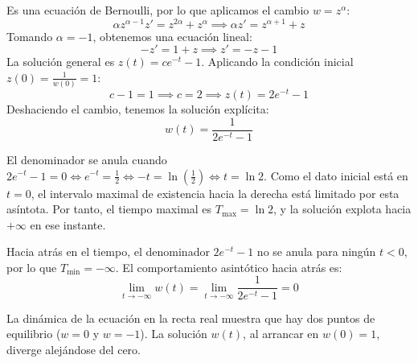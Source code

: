 {    Es una ecuación de Bernoulli, por lo que aplicamos el cambio $w = z^\alpha$:
    \[
        \alpha z^{\alpha-1} z' = z^{2\alpha} + z^\alpha \implies \alpha z' = z^{\alpha+1} + z
    \]
    Tomando $\alpha = -1$, obtenemos una ecuación lineal:
    \[
        -z' = 1 + z \implies z' = -z - 1
    \]
    La solución general es $z(t) = c e^{-t} - 1$. Aplicando la condición inicial $z(0) = \frac{1}{w(0)} = 1$:
    \[
        c - 1 = 1 \implies c = 2 \implies z(t) = 2e^{-t} - 1
    \]
    Deshaciendo el cambio, tenemos la solución explícita:
    \[
        w(t) = \frac{1}{2e^{-t} - 1}
    \]
    
    El denominador se anula cuando $2e^{-t} - 1 = 0 \iff e^{-t} = \frac{1}{2} \iff -t = \ln\left(\frac{1}{2}\right) \iff t = \ln 2$. 
    Como el dato inicial está en $t=0$, el intervalo maximal de existencia hacia la derecha está limitado por esta asíntota. Por tanto, el tiempo maximal es $T_{\max} = \ln 2$, y la solución explota hacia $+\infty$ en ese instante.
    
    Hacia atrás en el tiempo, el denominador $2e^{-t}-1$ no se anula para ningún $t < 0$, por lo que $T_{\min} = -\infty$. El comportamiento asintótico hacia atrás es:
    \[
        \lim_{t \to -\infty} w(t) = \lim_{t \to -\infty} \frac{1}{2e^{-t} - 1} = 0
    \]
    
    \begin{center}
    \end{center}
    
    La dinámica de la ecuación en la recta real muestra que hay dos puntos de equilibrio ($w=0$ y $w=-1$). La solución $w(t)$, al arrancar en $w(0)=1$, diverge alejándose del cero.
    
    \begin{center}
\end{center}}
